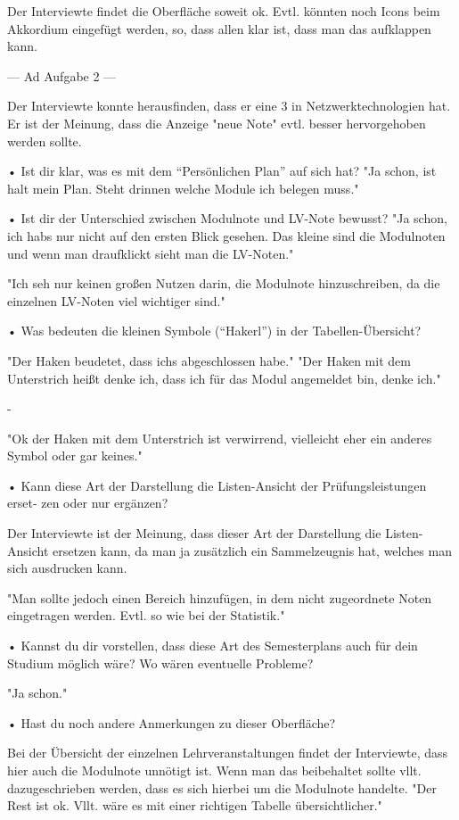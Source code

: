 \documentclass[a4paper,10pt]{scrartcl}
\begin{document}
Der Interviewte findet die Oberfläche soweit ok. Evtl. könnten noch Icons beim Akkordium eingefügt werden, so, dass allen klar ist, dass man das aufklappen kann.


---
Ad Aufgabe 2
---

Der Interviewte konnte herausfinden, dass er eine 3 in Netzwerktechnologien hat. Er ist der Meinung, dass die Anzeige "neue Note" evtl. besser hervorgehoben werden sollte.


• Ist dir klar, was es mit dem “Persönlichen Plan” auf sich hat?
"Ja schon, ist halt mein Plan. Steht drinnen welche Module ich belegen muss."


• Ist dir der Unterschied zwischen Modulnote und LV-Note bewusst?
"Ja schon, ich habs nur nicht auf den ersten Blick gesehen. Das kleine sind die Modulnoten und wenn man draufklickt sieht man die LV-Noten."

"Ich seh nur keinen großen Nutzen darin, die Modulnote hinzuschreiben, da die einzelnen LV-Noten viel wichtiger sind."

• Was bedeuten die kleinen Symbole (“Hakerl”) in der Tabellen-Übersicht?

"Der Haken beudetet, dass ichs abgeschlossen habe."
"Der Haken mit dem Unterstrich heißt denke ich, dass ich für das Modul angemeldet bin, denke ich."

-

"Ok der Haken mit dem Unterstrich ist verwirrend, vielleicht eher ein anderes Symbol oder gar keines."


• Kann diese Art der Darstellung die Listen-Ansicht der Prüfungsleistungen erset-
zen oder nur ergänzen?

Der Interviewte ist der Meinung, dass dieser Art der Darstellung die Listen-Ansicht ersetzen kann, da man ja zusätzlich ein Sammelzeugnis hat, welches man sich ausdrucken kann.

"Man sollte jedoch einen Bereich hinzufügen, in dem nicht zugeordnete Noten eingetragen werden. Evtl. so wie bei der Statistik."

• Kannst du dir vorstellen, dass diese Art des Semesterplans auch für dein Studium
möglich wäre? Wo wären eventuelle Probleme?

"Ja schon."


• Hast du noch andere Anmerkungen zu dieser Oberfläche?

Bei der Übersicht der einzelnen Lehrveranstaltungen findet der Interviewte, dass hier auch die Modulnote unnötigt ist. Wenn man das beibehaltet sollte vllt. dazugeschrieben werden, dass es sich hierbei um die Modulnote handelte. 
"Der Rest ist ok. Vllt. wäre es mit einer richtigen Tabelle übersichtlicher."
\end{document}
